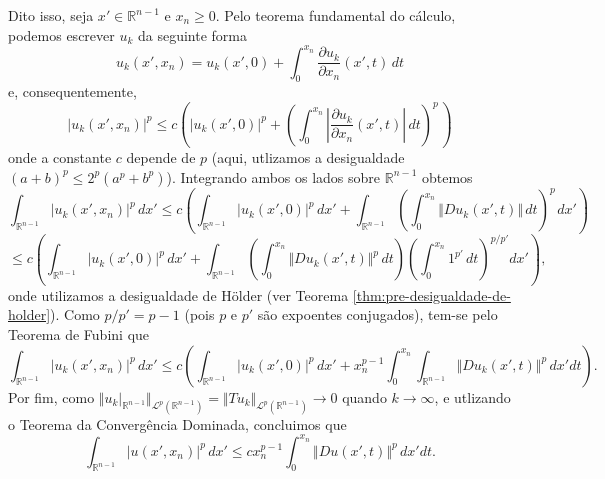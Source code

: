 \documentclass[a4paper, 11pt]{book}
\theoremstyle{definition}
\newcommand{\bR}{\mathbb{R}}
\newcommand{\cL}{\mathcal{L}}
\begin{document}
\begin{prf}
    Dito isso, seja $x' \in \bR^{n-1}$ e $x_n \geqslant 0$.
    Pelo teorema fundamental do cálculo, podemos escrever $u_k$ da seguinte forma
    \[
        u_k(x'\!,x_n) = u_k(x'\!,0) + \int_0^{x_n} \dfrac{\partial u_k}{\partial x_n} (x'\!,t) \,dt
    \]
    e, consequentemente,
    \[
        |u_k(x'\!,x_n)|^p \leqslant c \left(  |u_k(x'\!,0)|^p + \left(  \int_0^{x_n} \left|\dfrac{\partial u_k}{\partial x_n} (x'\!,t)\right| \,dt\right)^{\!p\,} \right)
    \]
    onde a constante $c$ depende de $p$ (aqui, utlizamos a desigualdade $(a + b)^p \leqslant 2^p (a^p + b^p)$). Integrando ambos os lados sobre $\bR^{n-1}$ obtemos
    \[
        \int_{\bR^{n-1}} |u_k(x',x_n)|^p \,dx' \leqslant c \left( \int_{\bR^{n-1}} |u_k(x',0)|^p \,dx' + \int_{\bR^{n-1}} \left(  \int_0^{x_n} \Vert Du_k(x',t) \Vert \,dt\right)^{\!p\,} dx' \right)
    \]
    \[
        \leqslant  c \left( \int_{\bR^{n-1}} |u_k(x',0)|^p \,dx' + \int_{\bR^{n-1}} \left( \int_0^{x_n} \Vert Du_k (x',t) \Vert^p \,dt \right)\left( \int_0^{x_n} 1^{p'} \,dt \right)^{p/p'} dx'\right),
    \]
    onde utilizamos a desigualdade de Hölder (ver Teorema \ref{thm:pre-desigualdade-de-holder}).
    Como $p/p' = p-1$ (pois $p$ e $p'$ são expoentes conjugados), tem-se pelo Teorema de Fubini que
    \[
        \int_{\bR^{n-1}} |u_k(x',x_n)|^p \,dx' \leqslant c \left( \int_{\bR^{n-1}} |u_k(x',0)|^p \,dx' + x_n^{p-1} \int_{0}^{x_n} \int_{\bR^{n-1}} \Vert Du_k (x',t) \Vert^p  \,dx'dt \right).
    \]
    Por fim, como $\Vert u_k |_{\bR^{n-1}} \Vert_{\cL^p(\bR^{n-1})} = \Vert Tu_k \Vert_{\cL^p(\bR^{n-1})} \to 0$ quando $k \to \infty$, e utlizando o Teorema da Convergência Dominada, concluimos que
    \begin{equation} \label{eq:uuuuu}
        \int_{\bR^{n-1}} |u(x',x_n)|^p \,dx' \leqslant  c x_n^{p-1}\int_0^{x_n} \Vert Du(x',t) \Vert^p \,dx'dt.
    \end{equation}
    
    \begin{figure}
        \centering
\end{figure}
\end{prf}
\end{document}
